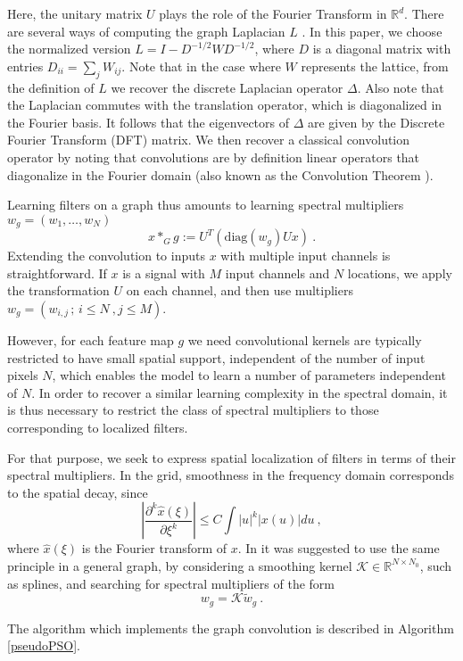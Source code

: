\documentclass{article} %
\begin{document}
Here, the unitary matrix $U$ plays the role of the Fourier Transform in $\mathbb{R}^d$. 
There are several ways of computing the graph Laplacian $L$ \cite{belkin2001laplacian}. In this paper, we choose the normalized version $L = I - D^{-1/2}WD^{-1/2}$, where $D$ is a diagonal matrix with entries $D_{ii} = \sum_j W_{ij}$. Note that in the case where $W$ represents the lattice, from the definition of $L$ we recover the discrete Laplacian operator $\Delta$. Also note that the Laplacian commutes with the translation operator, which is diagonalized in the Fourier basis. 
It follows that the eigenvectors of $\Delta$ are given by the Discrete Fourier Transform (DFT) matrix. 
We then recover a classical convolution operator by noting that convolutions are by definition linear operators that diagonalize in the Fourier domain (also known as the Convolution Theorem \cite{mallat1999wavelet}).

Learning filters on a graph thus amounts to learning spectral multipliers $w_g = (w_1, \dots,w_N)$ 
$$x \ast_G g := U^T ( \mbox{diag}(w_g) U x)~.$$
Extending the convolution to inputs $x$ with multiple input channels is straightforward. If $x$ is a signal with $M$ input channels and $N$ locations, we apply the transformation $U$ on each channel, and then use multipliers $w_g =  (w_{i,j}\, ;\, i \leq N~, j \leq M)$. 

However, for each feature map $g$ we need convolutional kernels are typically restricted to have small spatial support, independent of the number of input pixels $N$, which enables the model to learn a number of parameters independent of $N$. In order to recover a similar learning complexity in the spectral domain, it is thus necessary to restrict the class of spectral multipliers to those corresponding to localized filters. 

For that purpose, we seek to express spatial localization of filters in terms of their spectral multipliers. In the grid, smoothness in the frequency domain corresponds to the spatial decay, since
$$\left| \frac{\partial^k \hat{x}(\xi)}{\partial \xi^k} \right| \leq C \int |u|^k |x(u)| du~,$$
where $\hat{x}(\xi)$ is the Fourier transform of $x$.
In \cite{spectralnet2013} it was suggested to use the same principle in a general graph, by considering a smoothing kernel $\mathcal{K} \in \mathbb{R}^{N \times N_0}$, such as splines, and searching for spectral multipliers of the form
$$w_g = \mathcal{K} \tilde{w}_g~.$$

The algorithm which implements the graph convolution is described in Algorithm \ref{pseudoPSO}.
\end{document}
